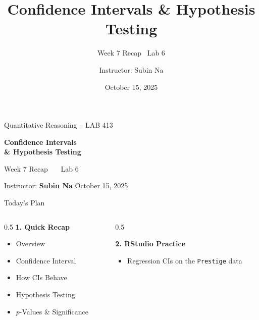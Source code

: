 \documentclass[aspectratio=169,11pt]{beamer}
\title{\bfseries Confidence Intervals \& Hypothesis Testing}
\subtitle{Week 7 Recap \textbullet\ Lab 6}
\author{Instructor: Subin Na}
\institute{Quantitative Reasoning -- LAB 413}
\date{October 15, 2025}
\begin{document}
{
\begin{frame}
  \vfill
  {\color{qrgray}\small Quantitative Reasoning -- LAB 413}\\[0.6em]
  {\color{qrnavy}\huge\bfseries Confidence Intervals\\[0.15em]\& Hypothesis Testing\par}
  \vspace{0.4em}
  {\color{qrblue}\large Week 7 Recap \ \textbullet\ \ Lab 6}\par
  \vspace{1.6em}
  {\color{qrgray} Instructor: \textbf{Subin Na} \hfill October 15, 2025}
  \vfill
\end{frame}
}

\begin{frame}{Today's Plan}
  \begin{columns}[T]
    \begin{column}{0.5\textwidth}
      \textbf{\color{qrnavy}1. Quick Recap}
      \begin{itemize}
        \item Overview
        \item Confidence Interval
        \item How CIs Behave
        \item Hypothesis Testing
        \item $p$-Values \& Significance
      \end{itemize}
    \end{column}
    \begin{column}{0.5\textwidth}
      \vspace{1.6em}

      \textbf{\color{qrnavy}2. RStudio Practice}
      \begin{itemize}
        \item Regression CIs on the \texttt{Prestige} data
      \end{itemize}
    \end{column}
  \end{columns}
\end{frame}
\end{document}

